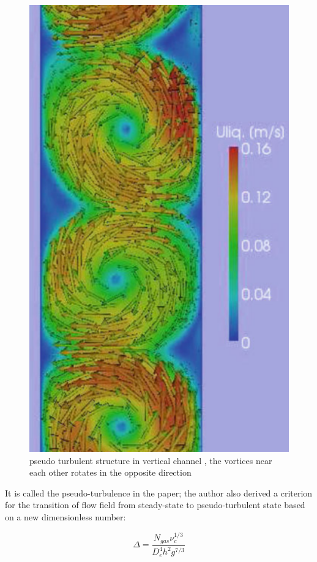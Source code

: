 \begin{figure}[H]
    \centering
    \includegraphics[scale=0.4]{vertical_rotating.png}
    \caption{pseudo turbulent structure in vertical channel \cite{Alexiadis2012}, the vortices near each other rotates in the opposite direction}
    \label{pseudo}
\end{figure}

It is called the pseudo-turbulence in the paper; the author also derived a criterion for the transition of flow field from steady-state to pseudo-turbulent state \cite{Alexiadis2012} based on a new dimensionless number:

\begin{equation}\label{ptcriterion}
    \Delta = \frac{N_{gas}\nu_c^{1/3}}{D_e^4h^2g^{7/3}}
\end{equation}

